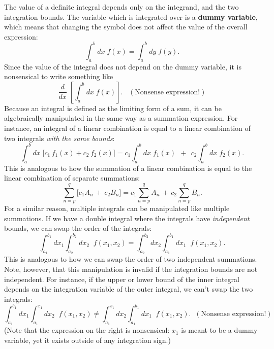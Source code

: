 \documentclass[10pt,a4paper]{article}
\begin{document}
The value of a definite integral depends only on the integrand, and the
two integration bounds. The variable which is integrated over is a
\textbf{dummy variable}, which means that changing the symbol does not
affect the value of the overall expression:
\begin{equation}
\int_a^b dx\; f(x) = \int_a^b dy\; f(y).
\end{equation}
Since the value of the integral does not depend on the dummy variable,
it is nonsensical to write something like
\begin{equation*}
\frac{d}{dx}\; \left[\int_a^b dx\; f(x)\right]. \;\;\;(\text{Nonsense expression}!)
\end{equation*}
Because an integral is defined as the limiting form of a sum, it can be
algebraically manipulated in the same way as a summation expression. For
instance, an integral of a linear combination is equal to a linear
combination of two integrals \emph{with the same bounds}:
\begin{equation}
\int_a^b dx \;\Big[c_1 \,f_1(x) + c_2\, f_2(x)\Big] = c_1 \int_{a}^{b} dx \; f_1(x)\;\, +\;\, c_2 \int_{a}^{b} dx\; f_2(x).
\end{equation}
This is analogous to how the summation of a linear combination is equal
to the linear combination of separate summations:
\begin{equation}
\sum_{n = p}^{q} \Big[ c_1  A_n \, + \, c_2 B_n\Big] = c_1 \sum_{n = p}^{q} A_n \, + \, c_2 \sum_{n = p}^{q} B_n.
\end{equation}
For a similar reason, multiple integrals can be manipulated like
multiple summations. If we have a double integral where the integrals
have \emph{independent} bounds, we can swap the order of the integrals:
\begin{equation}
\int_{a_1}^{b_1} dx_1 \int_{a_2}^{b_2} dx_2 \;\; f(x_1, x_2) = \int_{a_2}^{b_2} dx_2 \int_{a_1}^{b_1} dx_1 \;\; f(x_1, x_2).
\end{equation}
This is analogous to how we can swap the order of two independent
summations. Note, however, that this manipulation is invalid if the
integration bounds are not independent. For instance, if the upper or
lower bound of the inner integral depends on the integration variable of
the outer integral, we can't swap the two integrals:
\begin{equation*}
\int_{a_1}^{b_1} dx_1 \int_{a_1}^{x_1} dx_2 \;\; f(x_1, x_2) \ne \int_{a_1}^{x_1} dx_2 \int_{a_1}^{b_1} dx_1 \;\; f(x_1, x_2).\;\; (\text{Nonsense expression}!)
\end{equation*}
(Note that the expression on the right is nonsensical: $x_1$ is meant
to be a dummy variable, yet it exists outside of any integration sign.)
\end{document}
